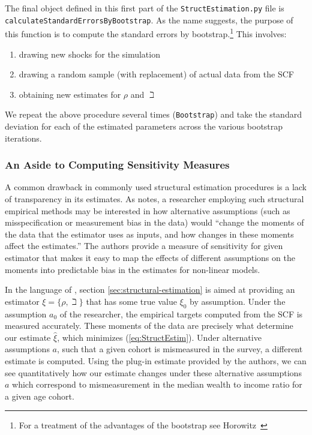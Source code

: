 \documentclass[titlepage, headings=optiontotocandhead]{econark}
\begin{document}
{The final object defined in this first part of the \texttt{StructEstimation.py}
file is \texttt{calculateStandardErrorsByBootstrap}. As the name suggests, the
purpose of this function is to compute the standard errors by bootstrap.\footnote{For a
  treatment of the advantages of the bootstrap see
  Horowitz~\citeyearpar{horowitzBootstrap}} This involves:
\begin{enumerate}
\item drawing new shocks for the simulation
\item drawing a random sample (with replacement) of actual data from the SCF
\item obtaining new estimates for $\rho$ and $\beth$
\end{enumerate}
We repeat the above procedure several times (\texttt{Bootstrap}) and
take the standard deviation for each of the estimated parameters across the various bootstrap iterations.

\hypertarget{sensitivity-measures}{}
\subsubsection{An Aside to Computing Sensitivity Measures}\label{subsubsec:sensmeas}


A common drawback in commonly used structural estimation procedures is a lack of transparency in its estimates.  As \cite{andrews2017measuring} notes, a researcher employing such structural empirical methods may be interested in how alternative assumptions (such as misspecification or measurement bias in the data) would ``change the moments of the data that the estimator uses as inputs, and how changes in these moments affect the estimates.'' The authors provide a measure of sensitivity for given estimator that makes it easy to map the effects of different assumptions on the moments into predictable bias in the estimates for non-linear models.

In the language of \cite{andrews2017measuring}, section \ref{sec:structural-estimation} is aimed at providing an estimator $\xi =\{\rho ,\beth\}$ that has some true value $\xi_0 $ by assumption. Under the assumption $a_0$ of the researcher, the empirical targets computed from the SCF is measured accurately. These moments of the data are precisely what determine our estimate $\hat{\xi}$, which minimizes (\ref{eq:StructEstim}). Under alternative assumptions $a$, such that a given cohort is mismeasured in the survey, a different estimate is computed. Using the plug-in estimate provided by the authors, we can see quantitatively how our estimate changes under these alternative assumptions $a$ which correspond to mismeasurement in the median wealth to income ratio for a given age cohort.

}
\end{document}
